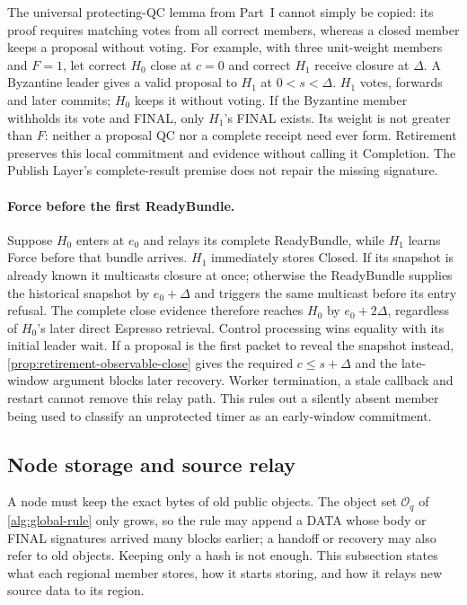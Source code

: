 \documentclass[11pt,a4paper]{article}
\begin{document}
The universal protecting-QC lemma from Part~I cannot simply be copied:
its proof requires matching votes from all correct members, whereas a
closed member keeps a proposal without voting. For example, with
three unit-weight members and $F=1$, let correct $H_0$ close at $c=0$
and correct $H_1$ receive closure at $\Delta$. A Byzantine leader gives
a valid proposal to $H_1$ at $0<s<\Delta$. $H_1$ votes, forwards and
later commits; $H_0$ keeps it without voting. If the Byzantine member
withholds its vote and FINAL, only $H_1$'s FINAL exists. Its weight is
not greater than $F$: neither a proposal QC nor a complete receipt need
ever form. Retirement preserves this local commitment and evidence
without calling it Completion. The Publish Layer's complete-result
premise does not repair the missing signature.

\paragraph{Force before the first ReadyBundle.}
Suppose $H_0$ enters at $e_0$ and relays its complete ReadyBundle, while
$H_1$ learns Force before that bundle arrives. $H_1$ immediately stores
Closed. If its snapshot is already known it multicasts closure at once;
otherwise the ReadyBundle supplies the historical snapshot by
$e_0+\Delta$ and triggers the same multicast before its entry refusal.
The complete close evidence therefore reaches $H_0$ by $e_0+2\Delta$,
regardless of $H_0$'s later direct Espresso retrieval. Control processing
wins equality with its initial leader wait. If a proposal is the first
packet to reveal the snapshot instead, \cref{prop:retirement-observable-close}
gives the required $c\le s+\Delta$ and the late-window argument blocks
later recovery. Worker termination, a stale callback and restart cannot
remove this relay path. This rules out a silently absent member being
used to classify an unprotected timer as an early-window commitment.
\subsection{Node storage and source relay}
\label{sec:source-step}
\label{sec:source-retention}
A node must keep the exact bytes of old public objects. The object set
$\mathcal O_q$ of \cref{alg:global-rule} only grows, so the rule may
append a DATA whose body or FINAL signatures arrived many blocks
earlier; a handoff or recovery may also refer to old objects. Keeping
only a hash is not enough. This subsection states what each regional member stores, how it starts storing, and how it relays new source data to its region.
\end{document}

